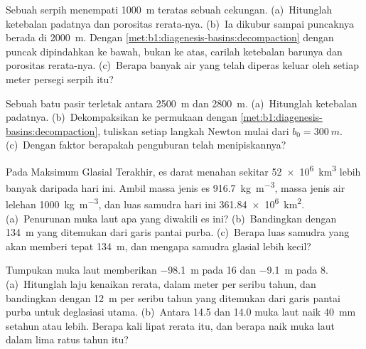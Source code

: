 \begin{exercise}[$\star\star$]\label{exo:b1:diagenesis-basins:5}
Sebuah serpih menempati \qty{1000}{m} teratas sebuah cekungan. (a)~Hitunglah ketebalan padatnya dan porositas rerata-nya. (b)~Ia dikubur sampai puncaknya berada di \qty{2000}{m}. Dengan \cref{met:b1:diagenesis-basins:decompaction} dengan puncak dipindahkan ke bawah, bukan ke atas, carilah ketebalan barunya dan porositas rerata-nya. (c)~Berapa banyak air yang telah diperas keluar oleh setiap meter persegi serpih itu?
\end{exercise}

\begin{exercise}[$\star\star$]\label{exo:b1:diagenesis-basins:6}
Sebuah batu pasir terletak antara \qty{2500}{m} dan \qty{2800}{m}. (a)~Hitunglah ketebalan padatnya. (b)~Dekompaksikan ke permukaan dengan \cref{met:b1:diagenesis-basins:decompaction}, tuliskan setiap langkah Newton mulai dari $b_0 = \qty{300}{m}$. (c)~Dengan faktor berapakah penguburan telah menipiskannya?
\end{exercise}

\begin{exercise}[$\star\star$]\label{exo:b1:diagenesis-basins:7}
Pada Maksimum Glasial Terakhir, es darat menahan sekitar \qty{52e6}{km^3} lebih banyak daripada hari ini. Ambil massa jenis es \qty{916.7}{kg.m^{-3}}, massa jenis air lelehan \qty{1000}{kg.m^{-3}}, dan luas samudra hari ini \qty{361.84e6}{km^2}. (a)~Penurunan muka laut apa yang diwakili es ini? (b)~Bandingkan dengan \qty{134}{m} yang ditemukan dari garis pantai purba. (c)~Berapa luas samudra yang akan memberi tepat \qty{134}{m}, dan mengapa samudra glasial lebih kecil?
\end{exercise}

\begin{exercise}[$\star\star$]\label{exo:b1:diagenesis-basins:8}
Tumpukan muka laut memberikan \qty{-98.1}{m} pada \qty{16}{\ka} dan \qty{-9.1}{m} pada \qty{8}{\ka}. (a)~Hitunglah laju kenaikan rerata, dalam meter per seribu tahun, dan bandingkan dengan \qty{12}{m} per seribu tahun yang ditemukan dari garis pantai purba untuk deglasiasi utama. (b)~Antara \qty{14.5}{\ka} dan \qty{14.0}{\ka} muka laut naik \qty{40}{mm} setahun atau lebih. Berapa kali lipat rerata itu, dan berapa naik muka laut dalam lima ratus tahun itu?
\end{exercise}

